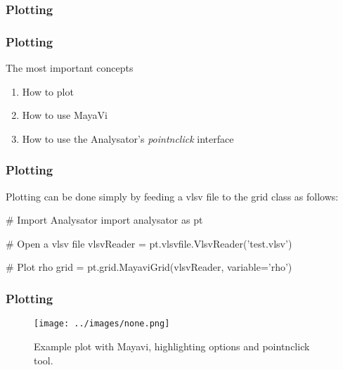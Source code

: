 \documentclass{beamer}
\begin{document}
\begin{frame}
 \frametitle{Plotting}
 \begin{center}
 \scalebox{0.8} {
 }
 \end{center}
\end{frame}

\begin{frame}
 \frametitle{Plotting}
 The most important concepts
 \begin{enumerate}
  \item How to plot
  \item How to use MayaVi
  \item How to use the Analysator's \emph{pointnclick} interface
 \end{enumerate}
\end{frame}

\begin{frame}[fragile]
 \frametitle{Plotting}
 \begin{center}
 \end{center}
 Plotting can be done simply by feeding a vlsv file to the grid class as follows:
 \begin{python}[basicstyle=\tiny]
  # Import Analysator
  import analysator as pt
  
  # Open a vlsv file
  vlsvReader = pt.vlsvfile.VlsvReader('test.vlsv')
  
  # Plot rho
  grid = pt.grid.MayaviGrid(vlsvReader, variable='rho')
 \end{python}
\end{frame}

\begin{frame}[fragile]
 \frametitle{Plotting}
 \begin{center}
 \end{center}
 \begin{figure}
  \centering
  \texttt{[image: ../images/none.png]}
  \caption{\tiny{Example plot with Mayavi, highlighting options and pointnclick tool.}}
  \label{fig:mayavi_example}
 \end{figure}
\end{frame}
\end{document}

